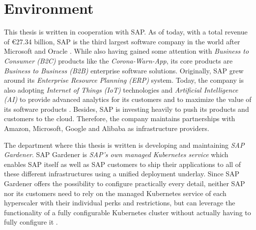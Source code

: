 \section{Environment}
This thesis is written in cooperation with SAP. As of today, with a total revenue of €27.34 billion, SAP is the third largest software company in the world after Microsoft and Oracle \cite{LargestSoftwareCompanies}. %
While also having gained some attention with \textit{Business to Consumer (B2C)} products like the \textit{Corona-Warn-App}, its core products are \textit{Business to Business (B2B)} enterprise software solutions. Originally, SAP grew around its \textit{Enterprise Resource Planning (ERP)} system. Today, the company is also adopting \textit{Internet of Things (IoT)} technologies and \textit{Artificial Intelligence (AI)} to provide advanced analytics for its customers and to maximize the value of its software products \cite{AboutSAP}. Besides, SAP is investing heavily to push its products and customers to the cloud. Therefore, the company maintains partnerships with Amazon, Microsoft, Google and Alibaba as infrastructure providers.\par 
The department where this thesis is written is developing and maintaining \textit{SAP Gardener}. SAP Gardener is \textit{SAP's own managed Kubernetes service} which enables SAP itself as well as SAP customers to ship their applications to all of these different infrastructures using a unified deployment underlay. Since SAP Gardener offers the possibility to configure practically every detail, neither SAP nor its customers need to rely on the managed Kubernetes service of each hyperscaler with their individual perks and restrictions, but can leverage the functionality of a fully configurable Kubernetes cluster without actually having to fully configure it \cite{GardenerValueProposition}. 
   
